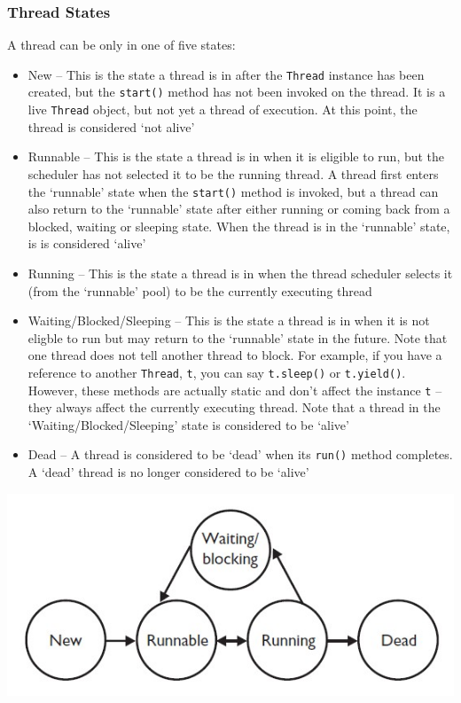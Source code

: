 \subsubsection{Thread States}
A thread can be only in one of five states:
\begin{itemize}
    \item New -- This is the state a thread is in after the \verb#Thread# 
    instance has been created, but the \verb#start()# method has not been 
    invoked on the thread. It is a live \verb#Thread# object, but not yet a 
    thread of execution. At this point, the thread is considered `not alive'
    \item Runnable -- This is the state a thread is in when it is eligible to 
    run, but the scheduler has not selected it to be the running thread. A 
    thread first enters the `runnable' state when the \verb#start()# method is 
    invoked, but a thread can also return to the `runnable' state after either 
    running or coming back from a blocked, waiting or sleeping state. When the 
    thread is in the `runnable' state, is is considered `alive'
    \item Running -- This is the state a thread is in when the thread scheduler 
    selects it (from the `runnable' pool) to be the currently executing thread
    \item Waiting/Blocked/Sleeping -- This is the state a thread is in when it 
    is not eligble to run but may return to the `runnable' state in the future.
    Note that one thread does not tell another thread to block. For example, if 
    you have a reference to another \verb#Thread#, \verb#t#, you can say 
    \verb#t.sleep()# or \verb#t.yield()#. However, these methods are actually 
    static and don't affect the instance \verb#t# -- they always affect the 
    currently executing thread. Note that a thread in the 
    `Waiting/Blocked/Sleeping' state is considered to be `alive'
    \item Dead -- A thread is considered to be `dead' when its \verb#run()# 
    method completes. A `dead' thread is no longer considered to be `alive'
\end{itemize}
\begin{center}
\includegraphics[scale=0.5]{Images/thread_states}
\end{center}

